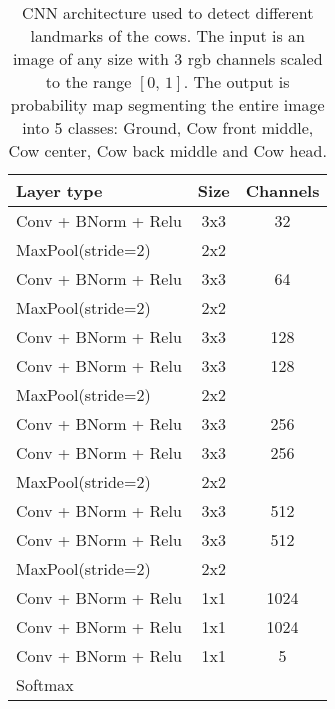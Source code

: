 \documentclass[10pt,a4paper,twocolumn]{article}
\begin{document}
\begin{table}
\begin{center}
\begin{tabular}{|l|c|c|}
\hline
\textbf{Layer type} & \textbf{Size} & \textbf{Channels} \\
\hline

Conv + BNorm + Relu & 3x3 & 32 \\
MaxPool(stride=2) & 2x2 &  \\
\hline

Conv + BNorm + Relu & 3x3 & 64 \\
MaxPool(stride=2) & 2x2 &  \\
\hline

Conv + BNorm + Relu & 3x3 & 128 \\
Conv + BNorm + Relu & 3x3 & 128 \\
MaxPool(stride=2) & 2x2 &  \\
\hline

Conv + BNorm + Relu & 3x3 & 256 \\
Conv + BNorm + Relu & 3x3 & 256 \\
MaxPool(stride=2) & 2x2 &  \\
\hline

Conv + BNorm + Relu & 3x3 & 512 \\
Conv + BNorm + Relu & 3x3 & 512 \\
MaxPool(stride=2) & 2x2 &  \\
\hline

Conv + BNorm + Relu & 1x1 & 1024 \\
Conv + BNorm + Relu & 1x1 & 1024 \\
Conv + BNorm + Relu & 1x1 & 5 \\
Softmax & & \\
\hline

\end{tabular}
\end{center}
\caption{CNN architecture used to detect different landmarks of the cows. The input is an image of any size with 3 rgb channels scaled to the range $\left[0,\,1\right]$. The output is probability map segmenting the entire image into 5 classes: Ground, Cow front middle, Cow center, Cow back middle and Cow head.}
\label{tab:cownet}
\end{table}
\end{document}
